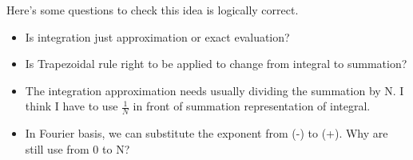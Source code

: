 \documentclass[11pt,letterpaper]{article}
\begin{document}
Here's some questions to check this idea is logically correct.
\begin{itemize} \item Is integration just approximation
or exact evaluation? \item Is Trapezoidal rule right to be applied
to change from integral to summation? \item The integration
approximation needs usually dividing the summation by N. I think I
have to use $\frac{1}{N}$ in front of summation representation of
integral. \item In Fourier basis, we can substitute the exponent
from (-) to (+). Why are still use from 0 to N?
\end{itemize}
\end{document}
